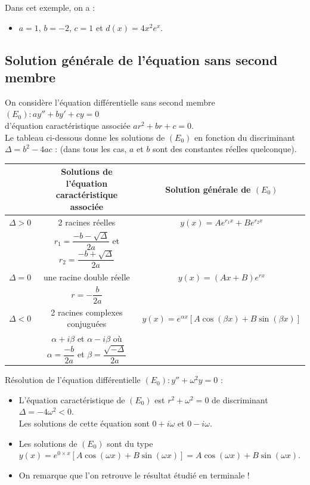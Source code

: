 \documentclass[french]{book}
\begin{document}
\begin{exemple}
Dans cet exemple, on a :
\begin{itemize}
   \item $a=1$, $b=-2$, $c=1$ et $d(x)=4x^2e^x$.
\end{itemize}
\end{exemple}


\subsection{Solution générale de l'équation sans second membre}

\begin{thm}
On considère l'équation différentielle sans second membre $(E_0):ay''+by'+cy= 0$ \\
d'équation caractéristique associée $ar^2+br+c= 0$. \\
Le tableau ci-dessous donne les solutions de $(E_0)$ en fonction du discriminant $\Delta =b^2-4ac$ : (dans tous les cas, $a$ et $b$ sont des constantes réelles quelconque).
\begin{center}
\begin{tabular}{c|c|c}
   & Solutions de l'équation caractéristique associée & Solution générale de $(E_0)$ \\
   \hline
   $\Delta> 0$ & 2 racines réelles & $y(x)= Ae^{r_1x}+Be^{r_2x}$ \\
   & $r_1 =\dfrac{-b-\sqrt{\Delta}}{2a}$ et $r_2 =\dfrac{-b+\sqrt{\Delta}}{2a}$ & \\
   \hline
   $\Delta= 0$ & une racine double réelle & $y(x)=(Ax+B)e^{rx}$ \\
   & $r =-\dfrac{b}{2a}$ & \\
   \hline
   $\Delta< 0$ & 2 racines complexes conjuguées & $y(x)= e^{\alpha x}[A\cos(\beta x)+B\sin(\beta x)]$ \\
   & $\alpha+i\beta$ et $\alpha-i\beta$ où $\alpha =\dfrac{-b}{2a}$ et $\beta  =\dfrac{\sqrt{-\Delta }}{2a}$ & \\
\end{tabular}
\end{center}
\end{thm}

\begin{exemple}
   Résolution de l'équation différentielle $(E_0):y''+\omega^2y=0$ :
   \begin{itemize}
      \item L'équation caractéristique de $(E_0)$ est $r^2+\omega^2 =0$ de discriminant $\Delta =-4\omega^2 <0$. \\
      \hspace*{0.3cm} Les solutions de cette équation sont $0+i\omega$ et $0-i\omega$.
      \item Les solutions de $(E_0)$ sont du type $y(x)= e^{0\times x}[A\cos(\omega x)+B\sin(\omega x)] = A\cos(\omega x)+B\sin(\omega x)$.
      \item On remarque que l'on retrouve le résultat étudié en terminale !
   \end{itemize}
\end{exemple}
\end{document}
